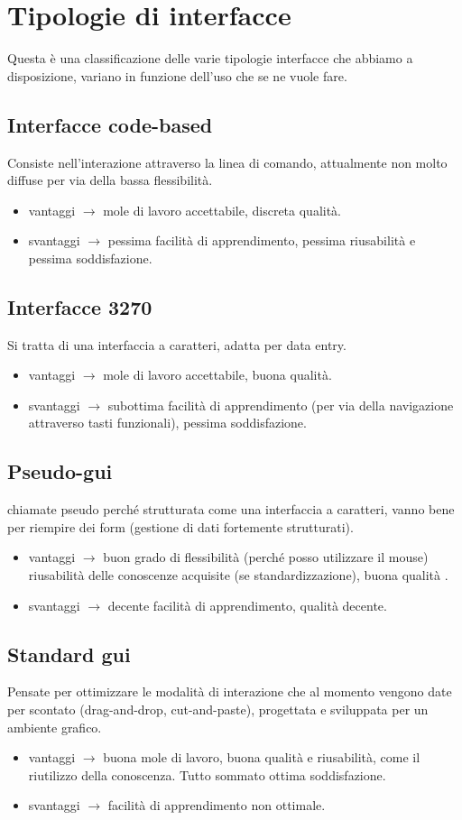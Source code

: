 \documentclass[a4paper,12pt]{report}
\begin{document}
	\section{Tipologie di interfacce}
	Questa è una classificazione delle varie tipologie interfacce che abbiamo a disposizione, variano in funzione dell'uso che se ne vuole fare.
	\subsection{Interfacce code-based}
	Consiste nell'interazione attraverso la linea di comando, attualmente non molto diffuse per via della bassa flessibilità.
	\begin{itemize}
		\item vantaggi  $\rightarrow$ mole di lavoro accettabile, discreta qualità. 
		\item svantaggi $\rightarrow$ pessima facilità di apprendimento, pessima riusabilità e pessima soddisfazione.
	\end{itemize}
	\subsection{Interfacce 3270}
	Si tratta di una interfaccia a caratteri, adatta per data entry.
	\begin{itemize} 
		\item vantaggi  $\rightarrow$ mole di lavoro accettabile, buona qualità.
		\item svantaggi $\rightarrow$ subottima facilità di apprendimento (per via della navigazione attraverso tasti funzionali), pessima soddisfazione.
	\end{itemize}
	\subsection{Pseudo-gui}
	chiamate pseudo perché strutturata come una interfaccia a caratteri, vanno bene per riempire dei form (gestione di dati fortemente strutturati).
	\begin{itemize} 
		\item vantaggi  $\rightarrow$ buon grado di flessibilità (perché posso utilizzare il mouse) riusabilità delle conoscenze acquisite (se standardizzazione), buona qualità . 
		\item svantaggi $\rightarrow$ decente facilità di apprendimento, qualità decente.
	\end{itemize}
	\subsection{Standard gui}
	Pensate per ottimizzare le modalità di interazione che al momento vengono date per scontato (drag-and-drop, cut-and-paste), progettata e sviluppata per un ambiente grafico.
	\begin{itemize} 
		\item vantaggi  $\rightarrow$ buona mole di lavoro, buona qualità e riusabilità, come il riutilizzo della conoscenza. Tutto sommato ottima soddisfazione.
		\item svantaggi $\rightarrow$ facilità di apprendimento non ottimale.
	\end{itemize}
\end{document}
